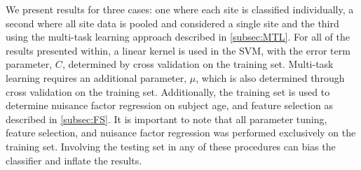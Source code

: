 \documentclass{llncs}
\begin{document}
We present results for three cases: one where each site is classified individually, a second where all site data is pooled and considered a single site and the third using the multi-task learning approach described in \ref{subsec:MTL}. For all of the results presented within, a linear kernel is used in the SVM, with the error term parameter, $C$,  determined by cross validation on the training set. Multi-task learning requires an additional parameter, $\mu$, which is also determined through cross validation on the training set. Additionally, the training set is used to determine nuisance factor regression on subject age, and feature selection as described in \ref{subsec:FS}. It is important to note that all parameter tuning, feature selection, and nuisance factor regression was performed exclusively on the training set. Involving the testing set in any of these procedures can bias the classifier and inflate the results. 

\end{document}
